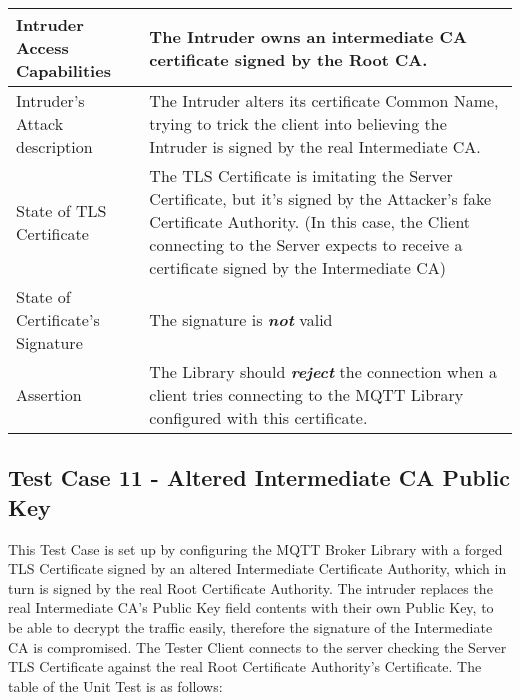 \documentclass[binding=0.6cm,noexaminfo]{sapthesis}
\begin{document}
\begin{center}
\begin{tabular}{| p{6cm} | p{6cm} |}
\hline
Intruder Access Capabilities & The Intruder owns an intermediate CA certificate signed by the Root CA. \\
\hline
Intruder’s Attack description & The Intruder alters its certificate Common Name, trying to trick the client into believing the Intruder is signed by the real Intermediate CA. \\
\hline
State of TLS Certificate & The TLS Certificate is imitating the Server Certificate, but it’s signed by the Attacker’s fake Certificate Authority. (In this case, the Client connecting to the Server expects to receive a certificate signed by the Intermediate CA) \\
\hline
State of Certificate’s Signature & The signature is \textbf{\textit{not}} valid \\
\hline
Assertion & The Library should \textbf{\textit{reject}} the connection when a client tries connecting to the MQTT Library configured with this certificate. \\
\hline
\end{tabular}
\end{center}

\subsection{Test Case 11 - Altered Intermediate CA Public Key}
This Test Case is set up by configuring the MQTT Broker Library with a forged TLS Certificate signed by an altered Intermediate Certificate Authority, which in turn is signed by the real Root Certificate Authority. The intruder replaces the real Intermediate CA’s Public Key field contents with their own Public Key, to be able to decrypt the traffic easily, therefore the signature of the Intermediate CA is compromised. The Tester Client connects to the server checking the Server TLS Certificate against the real Root Certificate Authority’s Certificate. The table of the Unit Test is as follows:
\end{document}
